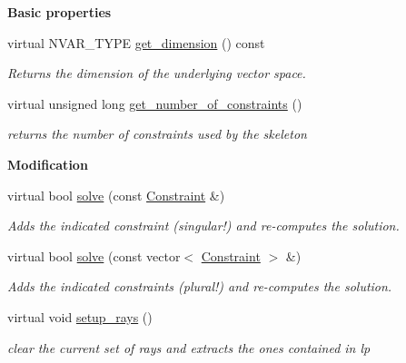 \begin{Indent}\textbf{ Basic properties}\par
\begin{DoxyCompactItemize}
\item 
\mbox{\label{group___c_l_s_solvers_acc09a573b2ed49e2019d0c7a2f0c3b40}} 
virtual N\+V\+A\+R\+\_\+\+T\+Y\+PE \hyperlink{group___c_l_s_solvers_acc09a573b2ed49e2019d0c7a2f0c3b40}{get\+\_\+dimension} () const
\begin{DoxyCompactList}\small\item\em Returns the dimension of the underlying vector space. \end{DoxyCompactList}\item 
virtual unsigned long \hyperlink{group___c_l_s_solvers_a8c8dbe226a971e62159888aecacce458}{get\+\_\+number\+\_\+of\+\_\+constraints} ()
\begin{DoxyCompactList}\small\item\em returns the number of constraints used by the skeleton \end{DoxyCompactList}\end{DoxyCompactItemize}
\end{Indent}
\begin{Indent}\textbf{ Modification}\par
\begin{DoxyCompactItemize}
\item 
virtual bool \hyperlink{group___c_l_s_solvers_affe1dce30ec7bad7c54e4edf9283235e}{solve} (const \hyperlink{group___c_l_s_solvers_class_l_p___solvers_1_1_constraint}{Constraint} \&)
\begin{DoxyCompactList}\small\item\em Adds the indicated constraint (singular!) and re-\/computes the solution. \end{DoxyCompactList}\item 
virtual bool \hyperlink{group___c_l_s_solvers_a6f73ee7b0d42f78fd95e399c474b3eb4}{solve} (const vector$<$ \hyperlink{group___c_l_s_solvers_class_l_p___solvers_1_1_constraint}{Constraint} $>$ \&)
\begin{DoxyCompactList}\small\item\em Adds the indicated constraints (plural!) and re-\/computes the solution. \end{DoxyCompactList}\item 
\mbox{\label{group___c_l_s_solvers_a1b50fd63c3032192d02d9a1b2411e33a}} 
virtual void \hyperlink{group___c_l_s_solvers_a1b50fd63c3032192d02d9a1b2411e33a}{setup\+\_\+rays} ()
\begin{DoxyCompactList}\small\item\em clear the current set of rays and extracts the ones contained in lp \end{DoxyCompactList}\end{DoxyCompactItemize}
\end{Indent}

